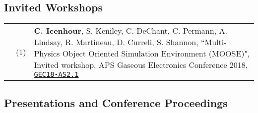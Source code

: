\documentclass{article}
\begin{document}
\subsection*{Invited Workshops}

	\begin{tabularx}{\textwidth}{l l X}
		\hspace{2em}
			& (1)  & \textbf{C. Icenhour}, S. Keniley, C. DeChant, C. Permann, A. Lindsay, R. Martineau, D. Curreli, S. Shannon, ``Multi-Physics Object Oriented Simulation Environment (MOOSE)", Invited workshop, APS Gaseous Electronics Conference 2018, \href{http://meetings.aps.org/link/BAPS.2018.GEC.AS2.1}{\texttt{GEC18-AS2.1}}
	\end{tabularx}

\subsection*{Presentations and Conference Proceedings}
\end{document}
